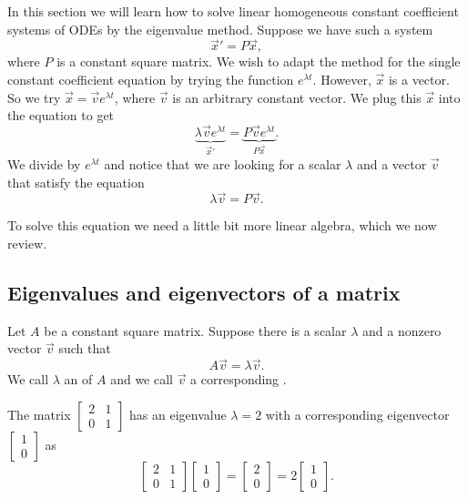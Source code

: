 In this section we will learn how to solve linear homogeneous constant
coefficient systems of ODEs by the eigenvalue method.
Suppose we have such a system
\begin{equation*}
{\vec{x}}' = P\vec{x} ,
\end{equation*}
where
$P$ is a
constant square matrix.
We wish to
adapt the method for the single
constant coefficient equation by trying the function $e^{\lambda t}$.
However, $\vec{x}$ is a vector.  So we try $\vec{x} = \vec{v} e^{\lambda t}$, where
$\vec{v}$ is an arbitrary constant vector.  We plug this $\vec{x}$ into the equation to get
\begin{equation*}
\underbrace{\lambda \vec{v} e^{\lambda t}}_{{\vec{x}}'} =
\underbrace{P\vec{v} e^{\lambda t}}_{P\vec{x}} .
\end{equation*}
We divide by $e^{\lambda t}$ and notice that we are looking for a scalar $\lambda$
and a vector $\vec{v}$ that satisfy the equation
\begin{equation*}
\lambda \vec{v} = P\vec{v} .
\end{equation*}

To solve this equation we need a little bit more linear algebra, which we now
review.

\subsection{Eigenvalues and eigenvectors of a matrix}

Let $A$ be a constant square matrix.  Suppose there is a
scalar $\lambda$ and a nonzero vector $\vec{v}$ such that
\begin{equation*}
A \vec{v} = \lambda \vec{v}.
\end{equation*}
We call $\lambda$ an \emph{} of $A$ and we
call $\vec{v}$
a corresponding \emph{}.

\begin{example}
The matrix $\left[ \begin{smallmatrix}
2 & 1 \\
0 & 1
\end{smallmatrix} \right]$ has an eigenvalue $\lambda = 2$ with a
corresponding
eigenvector $\left[ \begin{smallmatrix}
1 \\ 0
\end{smallmatrix} \right]$ as
\begin{equation*}
\begin{bmatrix}
2 & 1 \\
0 & 1
\end{bmatrix}
\begin{bmatrix}
1 \\ 0
\end{bmatrix}
=
\begin{bmatrix}
2 \\
0 
\end{bmatrix}
=
2
\begin{bmatrix}
1 \\ 0
\end{bmatrix} .
\end{equation*}
\end{example}

